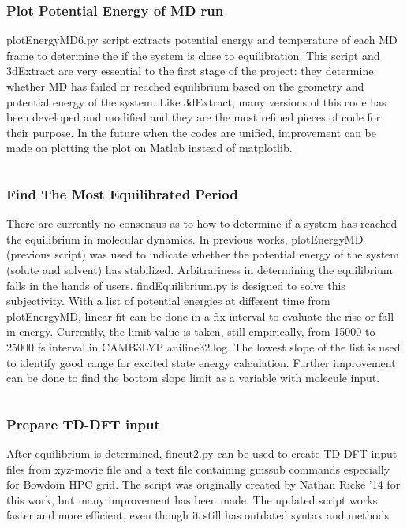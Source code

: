 \documentclass[
journal=jpcbfk, %
manuscript=article]{achemso}
\begin{document}
		\subsubsection{Plot Potential Energy of MD run}
			plotEnergyMD6.py script extracts potential energy and temperature of each MD frame to determine the if the system is close to equilibration. This script and 3dExtract are very essential to the first stage of the project: they determine whether MD has failed or reached equilibrium based on the geometry and potential energy of the system. Like 3dExtract, many versions of this code has been developed and modified and they are the most refined pieces of code for their purpose. In the future when the codes are unified, improvement can be made on plotting the plot on Matlab instead of matplotlib. 
			\inputminted[linenos, breaklines, baselinestretch=1, fontsize=\small]{python}{../pythonScripts/plotEnergyMD6.py} 	
		
		\subsubsection{Find The Most Equilibrated Period}
			There are currently no consensus as to how to determine if a system has reached the equilibrium in molecular dynamics. In previous works, plotEnergyMD (previous script) was used to indicate whether the potential energy of the system (solute and solvent) has stabilized. Arbitrariness in determining the equilibrium falls in the hands of users. findEquilibrium.py is designed to solve this subjectivity. With a list of potential energies at different time from plotEnergyMD, linear fit can be done in a fix interval to evaluate the rise or fall in energy. Currently, the limit value is taken, still empirically, from 15000 to 25000 fs interval in CAMB3LYP aniline32.log. The lowest slope of the list is used to identify good range for excited state energy calculation. Further improvement can be done to find the bottom slope limit as a variable with molecule input.
			\inputminted[linenos, breaklines, baselinestretch=1, fontsize=\small]{python}{../pythonScripts/findEquilibrium.py} 
		
		\subsubsection{Prepare TD-DFT input}
			After equilibrium is determined, fincut2.py can be used to create TD-DFT input files from xyz-movie file and a text file containing gmssub commands especially for Bowdoin HPC grid. The script was originally created by Nathan Ricke '14 for this work, but many improvement has been made. The updated script works faster and more efficient, even though it still has outdated syntax and methods.
			\inputminted[linenos, breaklines, baselinestretch=1, fontsize=\small]{python}{../pythonScripts/fincut2.py} 
		
\end{document}
